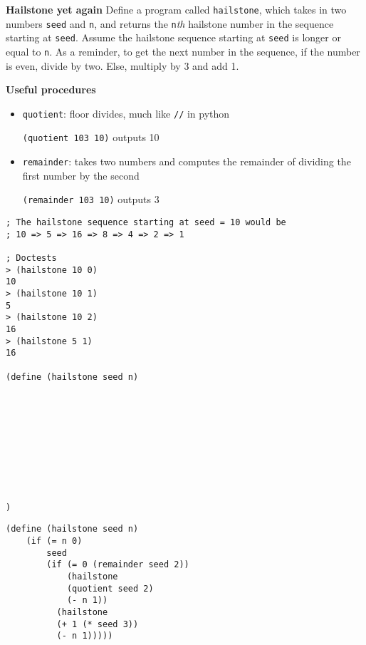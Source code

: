 \begin{blocksection}
\question \textbf{Hailstone yet again} Define a program called \lstinline$hailstone$,
which takes in two numbers \lstinline$seed$ and \lstinline$n$, and returns the
\lstinline$n$\emph{th} hailstone number in the sequence starting at \lstinline$seed$.
Assume the hailstone sequence starting at \lstinline$seed$ is longer or equal to
\lstinline$n$. As a reminder, to get the next number in the sequence, if the number
is even, divide by two. Else, multiply by 3 and add 1.

\textbf{Useful procedures}

\begin{itemize}
\item \lstinline$quotient$: floor divides, much like \lstinline$//$ in python

\lstinline$(quotient 103 10)$ outputs 10

\item \lstinline$remainder$: takes two numbers and computes the remainder of dividing the first number by the second

\lstinline$(remainder 103 10)$ outputs 3
\end{itemize}

\vspace{\baselineskip}
\begin{lstlisting}
; The hailstone sequence starting at seed = 10 would be
; 10 => 5 => 16 => 8 => 4 => 2 => 1

; Doctests
> (hailstone 10 0)
10
> (hailstone 10 1)
5
> (hailstone 10 2)
16
> (hailstone 5 1)
16

(define (hailstone seed n)










)
\end{lstlisting}
\end{blocksection}

\begin{solution}[-32pt]
\begin{blocksection}
\begin{lstlisting}
(define (hailstone seed n)
    (if (= n 0)
        seed
        (if (= 0 (remainder seed 2))
            (hailstone
            (quotient seed 2)
            (- n 1))
          (hailstone
          (+ 1 (* seed 3))
          (- n 1)))))
\end{lstlisting}
\end{blocksection}
\end{solution}


